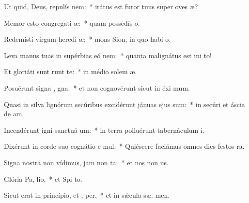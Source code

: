 \item Ut quid, Deus, repulís  nem:~* irátus est furor tuus super oves  æ?
\item Memor esto congregati æ:~* quam possedís  o.
\item Redemísti virgam heredi æ:~* mons Sion, in quo habi  o.
\item Leva manus tuas in supérbias eó  nem:~* quanta malignátus est ini  to!
\item Et gloriáti sunt  runt te:~* in médio solem æ.
\item Posuérunt signa , gna:~* et non cognovérunt sicut in éxi  mum.
\item Quasi in silva lignórum secúribus excidérunt jánuas ejus  sum:~* in secúri et áscia de am.
\item Incendérunt igni sanctuá um:~* in terra polluérunt tabernáculum  i.
\item Dixérunt in corde suo cognátio e mul:~* Quiéscere faciámus omnes dies festos   ra.
\item Signa nostra non vídimus, jam non  ta:~* et nos non  us.
\item Glória Pa,  lio,~* et Spi to.
\item Sicut erat in princípio, et ,  per,~* et in sǽcula sæ. men.
